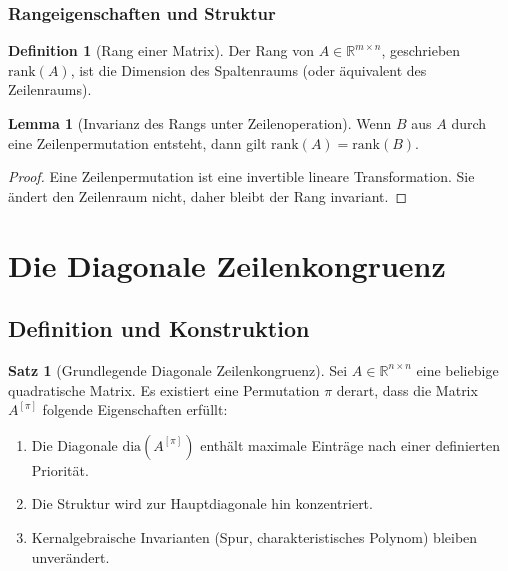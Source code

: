 \documentclass[a4paper,12pt]{article}
\theoremstyle{definition}
\newtheorem{definition}{Definition}
\newtheorem{satz}{Satz}
\newtheorem{lemma}{Lemma}
\begin{document}
\subsubsection{Rangeigenschaften und Struktur}

\begin{definition}[Rang einer Matrix]
	Der Rang von $A \in \mathbb{R}^{m \times n}$, geschrieben $\text{rank}(A)$, ist die Dimension des Spaltenraums (oder äquivalent des Zeilenraums).
\end{definition}

\begin{lemma}[Invarianz des Rangs unter Zeilenoperation]
	\label{lem:rang-invarianz}
	Wenn $B$ aus $A$ durch eine Zeilenpermutation entsteht, dann gilt $\text{rank}(A) = \text{rank}(B)$.
\end{lemma}

\begin{proof}
	Eine Zeilenpermutation ist eine invertible lineare Transformation. Sie ändert den Zeilenraum nicht, daher bleibt der Rang invariant.
\end{proof}

\section{Die Diagonale Zeilenkongruenz}

\subsection{Definition und Konstruktion}

\begin{satz}[Grundlegende Diagonale Zeilenkongruenz]
	\label{satz:diag-grundlegend}
	Sei $A \in \mathbb{R}^{n \times n}$ eine beliebige quadratische Matrix. Es existiert eine Permutation $\pi$ derart, dass die Matrix $A^{[\pi]}$ folgende Eigenschaften erfüllt:
	\begin{enumerate}
		\item Die Diagonale $\text{dia}(A^{[\pi]})$ enthält maximale Einträge nach einer definierten Priorität.
		\item Die Struktur wird zur Hauptdiagonale hin konzentriert.
		\item Kernalgebraische Invarianten (Spur, charakteristisches Polynom) bleiben unverändert.
	\end{enumerate}
\end{satz}
\end{document}
